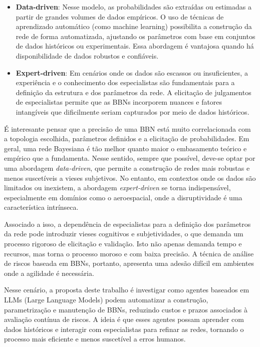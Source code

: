 \label{subsec:parametros}
\begin{itemize}
  \item \textbf{Data‑driven}: Nesse modelo, as probabilidades são extraídas ou estimadas a partir de grandes volumes de dados empíricos. O uso de técnicas de aprendizado automático (como machine learning) possibilita a construção da rede de forma automatizada, ajustando os parâmetros com base em conjuntos de dados históricos ou experimentais. Essa abordagem é vantajosa quando há disponibilidade de dados robustos e confiáveis.


  \item \textbf{Expert‑driven}: Em cenários onde os dados são escassos ou insuficientes, a experiência e o conhecimento dos especialistas são fundamentais para a definição da estrutura e dos parâmetros da rede. A elicitação de julgamentos de especialistas permite que as BBNs incorporem nuances e fatores intangíveis que dificilmente seriam capturados por meio de dados históricos.
\end{itemize}

É interesante pensar que a precisão de uma BBN está muito correlacionada com a topologia escolhida, parâmetros definidos e a elicitação de probabilidades. Em geral, uma rede Bayesiana é tão melhor quanto maior o embasamento teórico e empírico que a fundamenta. Nesse sentido, sempre que possível, deve-se optar por uma abordagem \emph{data‑driven}, que permite a construção de redes mais robustas e menos suscetíveis a vieses subjetivos. No entanto, em contextos onde os dados são limitados ou inexistem, a abordagem \emph{expert‑driven} se torna indispensável, especialmente em domínios como o aeroespacial, onde a disruptividade é uma característica intrínseca.

Associado a isso, a dependência de especialistas para a definição dos parâmetros da rede pode introduzir vieses cognitivos e subjetividades, o que demanda um processo rigoroso de elicitação e validação. Isto não apenas demanda tempo e recursos, mas torna o processo moroso e com baixa precisão. A técnica de análise de riscos baseada em BBNs, portanto, apresenta uma adesão difícil em ambientes onde a agilidade é necessária. 

Nesse cenário, a proposta deste trabalho é investigar como agentes baseados em LLMs (Large Language Models) podem automatizar a construção, parametrização e manutenção de BBNs, reduzindo custos e prazos associados à avaliação contínua de riscos. A ideia é que esses agentes possam aprender com dados históricos e interagir com especialistas para refinar as redes, tornando o processo mais eficiente e menos suscetível a erros humanos.







